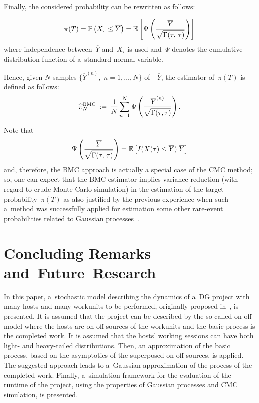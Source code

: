 \begin{multicols}{2}
Finally, the  considered probability can be rewritten as follows:

\begin{equation*}
\pi(T)=\mathbb{P}\left(X_{\tau}\le\overline{Y}\right)=
\mathbb{E}\left[\Psi\left(\displaystyle\frac{\displaystyle \overline{Y}\mathstrut}{\displaystyle  \sqrt{\Gamma(\tau,\,\tau)}\mathstrut}\right)\right]
\end{equation*}
where independence between~$\overline{Y}$ and~$X_{\tau}$ is used and~$\Psi$ denotes 
the cumulative distribution function of a~standard normal variable.

Hence, given $N$ samples $\{\overline{Y}^{(n)},\,\,n=1,\ldots,N\}$  of~~$\overline{Y}$,
the estimator of~$\pi(T)$ is defined as follows:
\begin{equation*}
\widehat{\pi}_N^{\mathrm{BMC}} \: := \: \displaystyle\frac{\displaystyle 1\mathstrut}{\displaystyle N\mathstrut}\sum\limits_{n=1}^N
\Psi
\left(\displaystyle\frac{\displaystyle \overline{Y}^{(n)}\mathstrut}{\displaystyle \sqrt{\Gamma(\tau,\tau)}\mathstrut}\right).
\end{equation*}


Note that
\begin{equation*}
\Psi\left(\displaystyle\frac{\displaystyle \overline{Y}\mathstrut}{\displaystyle  \sqrt{\Gamma(\tau,\,\tau)}\mathstrut}\right)=
\mathbb{E} \left[ I(X(\tau) \le \overline{Y}) | \overline{Y}\right]
\end{equation*}
and, therefore, the BMC approach is actually a special case of the  
CMC method;
so, one can expect that the BMC estimator implies variance reduction  (with
regard to crude 
Monte-Carlo simulation) in   the estimation of the target probability~$\pi(T)$ as also 
justified by the previous experience when such a~method was successfully applied for 
estimation some other rare-event probabilities related to Gaussian 
processes~\cite{23-luk-1}.  


\section{Concluding Remarks and~Future~Research}

\noindent
 In this paper,   a~stochastic model describing the dynamics of 
 a~DG project with many hosts and many work\-units to be performed, originally
 proposed in~\cite{1-luk-1},  is presented. 
 It is assumed that the project  can be   described by the so-called on-off model 
 where the hosts are on-off  sources of the work\-units  and the basic process is the 
 completed work. It is assumed that  the hosts' working sessions can have both 
  light- and heavy-tailed distributions.
 Then, an approximation of the  basic process, based on  the asymptotics of 
 the superposed on-off sources, is applied.    
 The suggested approach   leads to a~Gaussian approximation of the process of the 
 completed work. Finally,  a~simulation framework for the evaluation 
 of the runtime of the project, using the properties of Gaussian processes and 
 CMC simulation, is presented. 


\end{multicols}
